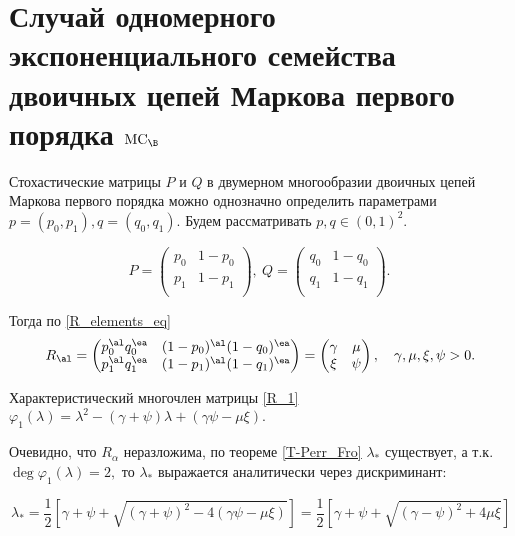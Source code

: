 
\section{Случай одномерного экспоненциального семейства двоичных цепей Маркова первого порядка $\mathrm{MC}_\B$}


Стохастические матрицы $P$ и $Q$ в двумерном многообразии двоичных цепей Маркова первого порядка можно однозначно определить параметрами $p = (p_0, p_1), q = (q_0, q_1).$ Будем рассматривать $p, q \in (0, 1)^2.$

\begin{equation}
\label{PQ_first}
P = \begin{pmatrix}
p_0 & 1 - p_0 \\
p_1 & 1 - p_1 \\
\end{pmatrix}, \ 
Q = \begin{pmatrix}
q_0 & 1 - q_0 \\
q_1 & 1 - q_1 \\
\end{pmatrix}. \ 
\end{equation}  

Тогда по \eqref{R_elements_eq} 
\begin{equation}
\label{R_1}
R_\al = \begin{pmatrix}
p_0^\al q_0^\ea & (1 - p_0)^\al (1 - q_0)^\ea \\
p_1^\al q_1^\ea & (1 - p_1)^\al (1 - q_1)^\ea \\
\end{pmatrix} = 
\begin{pmatrix}
\gamma & \mu \\
\xi & \psi \\
\end{pmatrix}, \quad \gamma, \mu, \xi, \psi > 0.
\end{equation}

Характеристический многочлен матрицы \eqref{R_1} $\varphi_1(\lambda) = \lambda^2 - (\gamma + \psi)\lambda + (\gamma \psi - \mu \xi).$

Очевидно, что $R_\alpha$ неразложима, по теореме \ref{T-Perr_Fro} $\lambda_\ast$ существует, а т.к. $\deg \varphi_1(\lambda) = 2,$ то $\lambda_\ast$ выражается аналитически через дискриминант:

\begin{equation}
\label{L1_to_simp}
\lambda_\ast = \frac{1}{2} \left[ \gamma + \psi + \sqrt{(\gamma + \psi)^2 - 4 (\gamma \psi - \mu \xi)} \right] = \frac{1}{2} \left[ \gamma + \psi + \sqrt{(\gamma - \psi)^2 + 4 \mu \xi} \right]
\end{equation}

